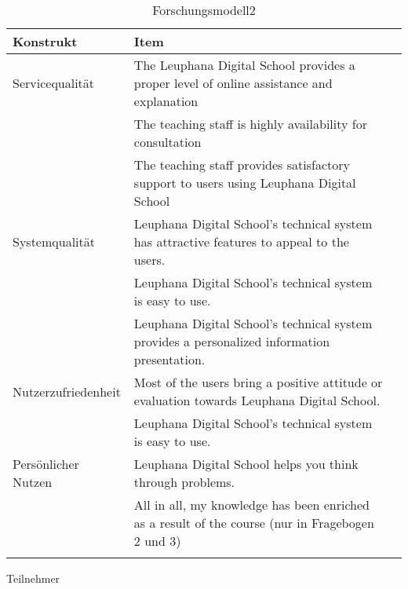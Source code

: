 
\begin{table}[ht] 
\caption{Forschungsmodell2}
\label{tab:Forschungsmodell} 
\begin{tabular}{@{}lp{12cm}r@{}} \toprule

\textbf{Konstrukt} & \textbf{Item} \\ \midrule

Servicequalität & The Leuphana Digital School provides a proper level of online assistance and explanation \\ \addlinespace
& The teaching staff is highly availability for consultation\\\addlinespace
& \parbox[t]{12cm}{The teaching staff provides satisfactory support to users using Leuphana Digital School} \\ \addlinespace
Systemqualität & \parbox[t]{12cm}{Leuphana Digital School’s technical system has attractive features to appeal to the users.}\\ \addlinespace
& Leuphana Digital School’s technical system is easy to use. \\\addlinespace
& \parbox[t]{12cm}{Leuphana Digital School’s technical system provides a personalized information presentation.} \\ \addlinespace
Nutzerzufriedenheit & \parbox[t]{12cm}{Most of the users bring a positive attitude or evaluation towards Leuphana Digital School.} \\ \addlinespace
& Leuphana Digital School’s technical system is easy to use.  \\ \addlinespace 
Persönlicher Nutzen & \parbox[t]{12cm}{Leuphana Digital School helps you think through problems.} \\ \addlinespace 
& \parbox[t]{12cm}{All in all, my knowledge has been enriched as a result of the course (nur in Fragebogen 2 und 3)} \\ \addlinespace 
  \bottomrule

\end{tabular}	
\end{table}

Teilnehmer


